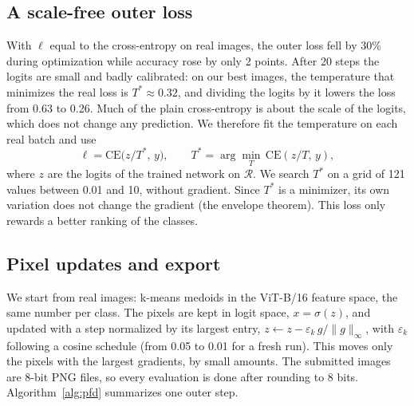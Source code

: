 \documentclass[journal]{IEEEtran}
\begin{document}
\subsection{A scale-free outer loss}
\label{sec:scalefree}
With $\ell$ equal to the cross-entropy on real images, the outer loss fell by 30\% during optimization while
accuracy rose by only 2 points. After 20 steps the logits are small and badly calibrated: on our best images, the
temperature that minimizes the real loss is $T^\ast\approx0.32$, and dividing the logits by it lowers the loss from
0.63 to 0.26. Much of the plain cross-entropy is about the scale of the logits, which does not change any prediction.
We therefore fit the temperature on each real batch and use
\begin{equation}
\ell = \mathrm{CE}\big(z/T^\ast,\,y\big),\qquad T^\ast = \arg\min_{T}\,\mathrm{CE}(z/T,\,y),
\label{eq:scalefree}
\end{equation}
where $z$ are the logits of the trained network on $\mathcal{R}$. We search $T^\ast$ on a grid of 121 values between
0.01 and 10, without gradient. Since $T^\ast$ is a minimizer, its own variation does not change the gradient (the
envelope theorem). This loss only rewards a better ranking of the classes.

\subsection{Pixel updates and export}
We start from real images: k-means medoids in the ViT-B/16 feature space, the same number per class.
The pixels are kept in logit space, $x=\sigma(z)$, and updated with a step normalized by its largest entry,
$z \leftarrow z - \varepsilon_k\, g/\|g\|_\infty$, with $\varepsilon_k$ following a cosine schedule (from 0.05 to 0.01
for a fresh run). This moves only the pixels with the largest gradients, by small amounts. The submitted images are
8-bit PNG files, so every evaluation is done after rounding to 8 bits. Algorithm~\ref{alg:pfd} summarizes one outer
step.
\end{document}

